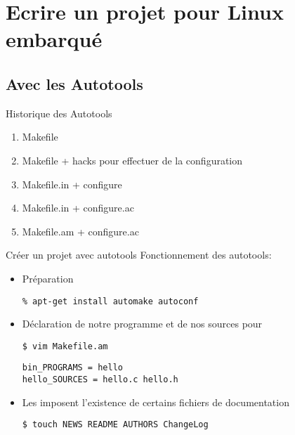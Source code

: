 \section{Ecrire un projet pour Linux embarqué}

\subsection{Avec les Autotools}

\begin{frame}[fragile=singleslide]{Historique des Autotools}
  \begin{enumerate}
  \item Makefile
  \item Makefile + hacks pour effectuer de la configuration
  \item Makefile.in + configure
  \item Makefile.in + configure.ac
  \item Makefile.am + configure.ac
  \end{enumerate}
\end{frame}

\begin{frame}[fragile=singleslide]{Créer un projet avec autotools}
  Fonctionnement des autotools:
  \begin{itemize}
  \item Préparation
\begin{lstlisting}
% apt-get install automake autoconf
\end{lstlisting}
  \item Déclaration de notre programme et de nos sources pour 
\begin{lstlisting}
$ vim Makefile.am
\end{lstlisting} %
\begin{lstlisting}
bin_PROGRAMS = hello
hello_SOURCES = hello.c hello.h
\end{lstlisting}
  \item Les   imposent l'existence de certains fichiers
    de documentation
\begin{lstlisting}
$ touch NEWS README AUTHORS ChangeLog
\end{lstlisting} %
  \end{itemize}
\end{frame}

